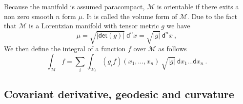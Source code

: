\documentclass[11pt]{book}
\renewcommand{\det}{\mathsf{det}}
\newcommand{\abs}[1]{\left|#1\right|}
\newcommand{\Mcal}{\mathcal{M}}
\newcommand{\dsf}{\mathsf{d}}
\theoremstyle{break}
\begin{document}
Because the manifold is assumed paracompact, $\Mcal$ is orientable if there exits a non zero smooth $n$ form $\mu$. It is called the volume form of $\Mcal$. Due to the fact that $\Mcal$ is a Lorentzian manifold with tensor metric $g$ we have 
%
\begin{equation*}
\mu = \sqrt{\abs{\det\left(g\right)}} \ \dsf^n x = \sqrt{\abs{g}} \ \dsf^n x \ ,
\end{equation*}
%
We then define the integral of a function $f$ over $\Mcal$ as follows
%
\begin{equation}
\int_\Mcal f = \sum_i \int_{W_i} (g_i f)(x_1,\dots,x_n) \ \sqrt{\abs{g}} \ \dsf x_1 \dots \dsf x_n \ .
\label{eq:int_manifold}
\end{equation}


\subsection{Covariant derivative, geodesic and curvature}
\label{p:CONNEX_GEOD_CURV}
\end{document}
